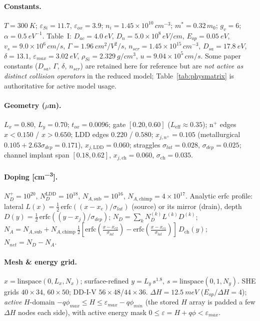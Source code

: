 \documentclass[11pt]{article}
\newcommand{\eps}{\varepsilon}
\begin{document}
\paragraph{Constants.} $T=\SI{300}{K}$; $\eps_{Si}=11.7$, $\eps_{ox}=3.9$;
$n_i=1.45\times10^{10}\,\si{cm^{-3}}$; $m^*=0.32\,m_0$; $g_v=6$; $\alpha=\SI{0.5}{eV^{-1}}$.
Table~I: $D_{ac}=\SI{4.0}{eV}$, $D_n=5.0\times10^{8}\,\si{eV/cm}$, $E_{op}=\SI{0.05}{eV}$,
$v_s=9.0\times10^{6}\,\si{cm/s}$, $\Gamma=\SI{1.96}{cm^2/V^2/s}$,
$n_{scr}=1.45\times10^{15}\,\si{cm^{-3}}$, $D_{sa}=\SI{17.8}{eV}$, $\delta=13.1$,
$\eps_{max}=\SI{3.02}{eV}$, $\rho_{Si}=\SI{2.329}{g/cm^3}$, $u=9.04\times10^{5}\,\si{cm/s}$.
Some paper constants ($D_{sa}$, $\Gamma$, $\delta$, $n_{scr}$) are retained here for reference but
are \emph{not active as distinct collision operators} in the reduced model; Table~\ref{tab:physmatrix}
is authoritative for active model usage.

\paragraph{Geometry ($\mu$m).} $L_x=0.80$, $L_y=0.70$; $t_{ox}=0.0096$; gate $[0.20,0.60]$
($L_{\text{eff}}\!\approx\!0.35$); n$^+$ edges $x{<}0.150$ / $x{>}0.650$; LDD edges $0.220$ /
$0.580$; $x_{j,n^+}=0.105$ (metallurgical $0.105{+}2.63\sigma_{dep}=0.171$),
$x_{j,\text{LDD}}=0.060$; straggles $\sigma_{lat}=0.028$, $\sigma_{dep}=0.025$; channel implant
span $[0.18,0.62]$, $x_{j,\text{ch}}=0.060$, $\sigma_{\text{ch}}=0.035$.

\paragraph{Doping [\si{cm^{-3}}].} $N_D^{+}=10^{20}$, $N_D^{\text{LDD}}=10^{18}$,
$N_{A,\text{sub}}=10^{16}$, $N_{A,\text{chimp}}=4\times10^{17}$. Analytic erfc profile: lateral
$L(x)=\tfrac12\,\mathrm{erfc}((x{-}x_e)/\sigma_{lat})$ (source) or its mirror (drain), depth
$D(y)=\tfrac12\,\mathrm{erfc}((y{-}x_j)/\sigma_{dep})$; $N_D=\sum_k N_D^{(k)}L^{(k)}D^{(k)}$;
$N_A=N_{A,\text{sub}}+N_{A,\text{chimp}}\,\tfrac12[\mathrm{erfc}(\tfrac{x-x_{c2}}{\sigma_{lat}})-
\mathrm{erfc}(\tfrac{x-x_{c1}}{\sigma_{lat}})]\,D_{\text{ch}}(y)$; $N_{net}=N_D-N_A$.

\paragraph{Mesh \& energy grid.} $x=\mathrm{linspace}(0,L_x,N_x)$; surface-refined
$y=L_y\,s^{1.8}$, $s=\mathrm{linspace}(0,1,N_y)$. SHE grids $40\times34$, $60\times50$; DD-I-V
$56\times48$/$44\times36$. $\Delta H=\SI{12.5}{meV}$ ($E_{op}/\Delta H=4$); \emph{active} $H$-domain
$-q\phi_{max}\le H\le\eps_{max}-q\phi_{min}$ (the stored $H$ array is padded a few $\Delta H$ nodes
each side), with active energy mask $0\le\eps\!=\!H{+}q\phi<\eps_{max}$.
\end{document}
